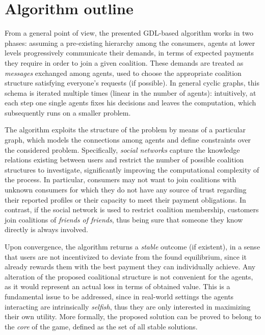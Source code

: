 \documentclass[11pt, twoside, titlepage, a4paper, openright]{report}
\begin{document}
\section{Algorithm outline}\label{sec:introexp}

From a general point of view, the presented GDL-based algorithm works in two phases: assuming a pre-existing hierarchy among the consumers, agents at lower levels progressively communicate their demands, in terms of expected payments they require in order to join a given coalition. These demands are treated as \textit{messages} exchanged among agents, used to choose the appropriate coalition structure satisfying everyone's requests (if possible). In general cyclic graphs, this schema is iterated multiple times (linear in the number of agents): intuitively, at each step one single agents fixes his decisions and leaves the computation, which subsequently runs on a smaller problem. 

The algorithm exploits the structure of the problem by means of a particular graph, which models the connections among agents and define constraints over the considered problem. Specifically, \textit{social networks} capture the knowledge relations existing between users and restrict the number of possible coalition structures to investigate, significantly improving the computational complexity of the process. In particular, consumers may not want to join coalitions with unknown consumers for
which they do not have any source of trust regarding their reported profiles or
their capacity to meet their payment obligations. 
In contrast, if the social network is used to restrict coalition membership, customers join coalitions of \emph{friends of friends}, thus being sure that someone they know directly is always involved. 

\newpage\noindent Upon convergence, the algorithm returns a \textit{stable} outcome (if existent), in a sense that users are not incentivized to deviate from the found equilibrium, since it already rewards them with the best payment they can individually achieve. Any alteration of the proposed coalitional structure is not convenient for the agents, as it would represent an actual loss in terms of obtained value. This is a fundamental issue to be addressed, since in real-world settings the agents interacting are intrinsically \textit{selfish}, thus they are only interested in maximizing their own utility. More formally, the proposed solution can be proved to belong to the \textit{core} of the game, defined as the set of all stable solutions. 
\end{document}
